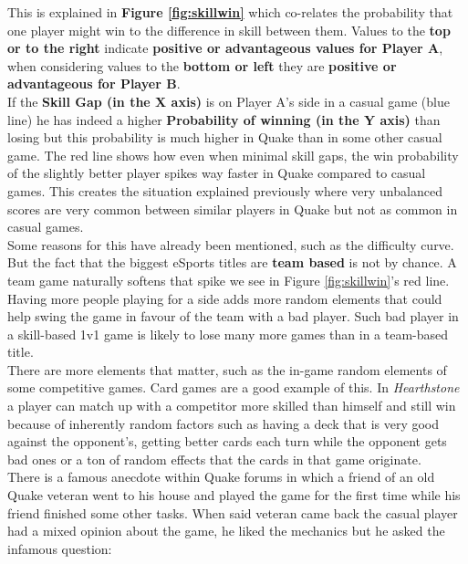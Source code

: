 This is explained in \textbf{Figure \ref{fig:skillwin}} which co-relates the probability that one player might win to the difference in skill between them. Values to the \textbf{top or to the right} indicate \textbf{positive or advantageous values for Player A}, when considering values to the \textbf{bottom or left} they are \textbf{positive or advantageous for Player B}.\\

If the \textbf{Skill Gap (in the X axis)} is on Player A's side in a casual game (blue line) he has indeed a higher \textbf{Probability of winning (in the Y axis)} than losing but this probability is much higher in Quake than in some other casual game. The red line shows how even when minimal skill gaps, the win probability of the slightly better player spikes way faster in Quake compared to casual games. This creates the situation explained previously where very unbalanced scores are very common between similar players in Quake but not as common in casual games.\\

Some reasons for this have already been mentioned, such as the difficulty curve. But the fact that the biggest eSports titles are \textbf{team based} is not by chance. A team game naturally softens that spike we see in Figure \ref{fig:skillwin}'s red line. Having more people playing for a side adds more random elements that could help swing the game in favour of the team with a bad player. Such bad player in a skill-based 1v1 game is likely to lose many more games than in a team-based title.\\

There are more elements that matter, such as the in-game random elements of some competitive games. Card games are a good example of this. In \textit{Hearthstone} \citep{game:hs} a player can match up with a competitor more skilled than himself and still win because of inherently random factors such as having a deck that is very good against the opponent's, getting better cards each turn while the opponent gets bad ones or a ton of random effects that the cards in that game originate.\\

There is a famous anecdote within Quake forums in which a friend of an old Quake veteran went to his house and played the game for the first time while his friend finished some other tasks. When said veteran came back the casual player had a mixed opinion about the game, he liked the mechanics but he asked the infamous question:

